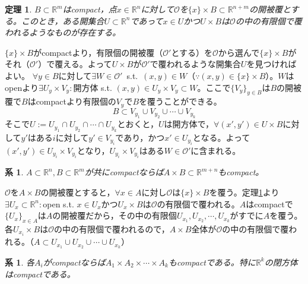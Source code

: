 \documentclass[dvipdfmx,a4j,10pt]{jsarticle}
\makeatletter
\theoremstyle{mystyle1}
\newtheorem{thm}[dfn]{定理}
\newtheorem{cor}[dfn]{系}
\theoremstyle{mystyle2}
\renewenvironment{proof}[1][\proofname]{\par
  \pushQED{\qed}%
  \normalfont
  \topsep6\p@\@plus6\p@ \trivlist
  \item[\hskip\labelsep{\bfseries\sffamily #1}]\ignorespaces
}{%
  \popQED\endtrivlist\@endpefalse
}
\renewcommand\proofname{証明}
\makeatother
\begin{document}
\begin{framed}
\begin{thm}\label{th1.4}
$B\subset\mathbb{R}^m$はcompact，点$x\in\mathbb{R}^n$に対して$\mathscr{O}$を$\{x\}\times B\subset\mathbb{R}^{n+m}$の開被覆とする。このとき，ある開集合$U\subset\mathbb{R}^n$であって$x\in U$かつ$U\times B$は$\mathscr{O}$の中の有限個で覆われるようなものが存在する。
\end{thm}
\end{framed}

\begin{proof}
    $\{x\}\times B$がcompactより，有限個の開被覆（$\mathscr{O}'$とする）を$\mathscr{O}$から選んで$\{x\}\times B$がそれ（$\mathscr{O}'$）で覆える。よって$U\times B$が$\mathscr{O}'$で覆われるような開集合$U$を見つければよい。
    $\forall y\in B$に対して$\exists W\in\mathscr{O}'$\ s.t.\ $(x,y)\in W$（$\because (x,y)\in\{x\}\times B$）。$W$はopenより$\exists U_y\times V_y:$開方体 s.t. $(x,y)\in U_y\times V_y\subset W$。ここで$\{V_y\}_{y\in B}$は$B$の開被覆で$B$はcompactより有限個の$V_y$で$B$を覆うことができる。
    \[
        B\subset V_{y_1}\cup V_{y_2}\cup\cdots\cup V_{y_k}
    \]
    そこで$U:=U_{y_1}\cap U_{y_2}\cap\cdots\cap U_{y_k}$とおくと，$U$は開方体で，$\forall (x',y')\in U\times B$に対して$y'$はある$i$に対して$y'\in V_{y_i}$であり，かつ$x'\in U_{y_i}$となる。よって$(x',y')\in U_{y_i}\times V_{y_i}$となり，$U_{y_i}\times V_{y_i}$はある$W\in\mathscr{O}'$に含まれる。
\end{proof}

\begin{framed}
\begin{cor}
$A\subset\mathbb{R}^n,B\subset\mathbb{R}^m$が共にcompactならば$A\times B\subset\mathbb{R}^{m+n}$もcompact。
\end{cor}
\end{framed}

\begin{proof}
    $\mathscr{O}$を$A\times B$の開被覆とすると，$\forall x\in A$に対し$\mathscr{O}$は$\{x\}\times B$を覆う。定理\ref{th1.4}より$\exists U_x\subset\mathbb{R}^n:$open s.t. $x\in U_x$かつ$U_x\times B$は$\mathscr{O}$の有限個で覆われる。$A$はcompactで$\{U_x\}_{x\in A}$は$A$の開被覆だから，その中の有限個$U_{x_1},U_{x_2},\cdots,U_{x_k}$がすでに$A$を覆う。各$U_{x_i}\times B$は$\mathscr{O}$の中の有限個で覆われるので，$A\times B$全体が$\mathscr{O}$の中の有限個で覆われる。（$A\subset U_{x_1}\cup U_{x_2}\cup \cdots \cup U_{x_k}$）
\end{proof}

\begin{framed}
    \begin{cor}\label{cor1.6}
        各$A_i$がcompactならば$A_1\times A_2\times \cdots \times A_k$もcompactである。特に$\mathbb{R}^k$の閉方体はcompactである。
    \end{cor}
\end{framed}
\end{document}
